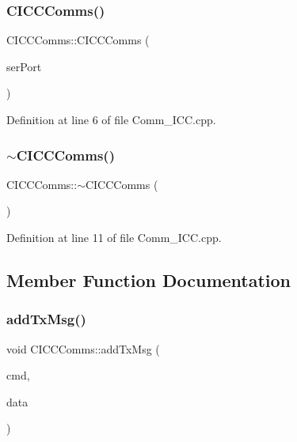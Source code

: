 \subsubsection{\texorpdfstring{C\+I\+C\+C\+Comms()}{CICCComms()}}
{\footnotesize\ttfamily C\+I\+C\+C\+Comms\+::\+C\+I\+C\+C\+Comms (\begin{DoxyParamCaption}\item[{\mbox{\hyperlink{class_c_serial}{C\+Serial}} \&}]{ser\+Port }\end{DoxyParamCaption})}



Definition at line 6 of file Comm\+\_\+\+I\+C\+C.\+cpp.

\mbox{\label{class_c_i_c_c_comms_a951ae11fd2024309bd4ecf67981287e7}} 
\subsubsection{\texorpdfstring{$\sim$\+C\+I\+C\+C\+Comms()}{~CICCComms()}}
{\footnotesize\ttfamily C\+I\+C\+C\+Comms\+::$\sim$\+C\+I\+C\+C\+Comms (\begin{DoxyParamCaption}{ }\end{DoxyParamCaption})}



Definition at line 11 of file Comm\+\_\+\+I\+C\+C.\+cpp.



\subsection{Member Function Documentation}
\mbox{\label{class_c_i_c_c_comms_ab925dd7ff82f30ccd9f770ab2281b3ab}} 
\subsubsection{\texorpdfstring{add\+Tx\+Msg()}{addTxMsg()}}
{\footnotesize\ttfamily void C\+I\+C\+C\+Comms\+::add\+Tx\+Msg (\begin{DoxyParamCaption}\item[{\mbox{\hyperlink{_a_d_a_s___types_8h_aba7bc1797add20fe3efdf37ced1182c5}{uint8\+\_\+t}}}]{cmd,  }\item[{signed int}]{data }\end{DoxyParamCaption})\hspace{0.3cm}{\ttfamily [virtual]}}



